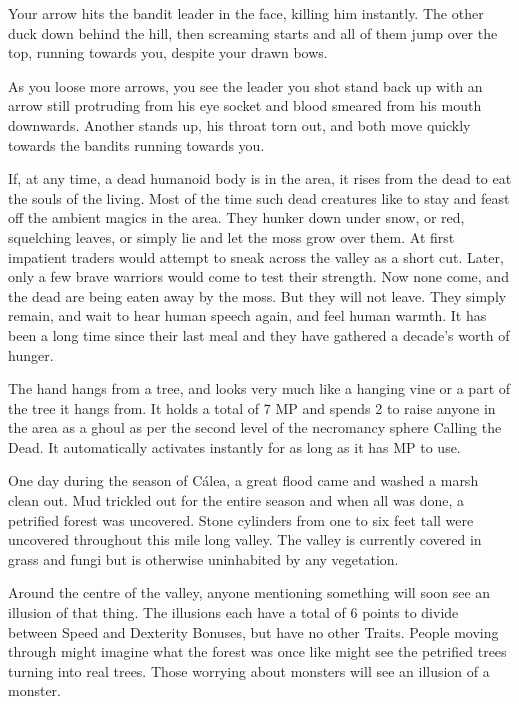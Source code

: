 \begin{multicols}{2}
\begin{boxtext}

  Your arrow hits the bandit leader in the face, killing him instantly.
  The other duck down behind the hill, then screaming starts and all of them jump over the top, running towards you, despite your drawn bows.

  As you loose more arrows, you see the leader you shot stand back up with an arrow still protruding from his eye socket and blood smeared from his mouth downwards.
  Another stands up, his throat torn out, and both move quickly towards the bandits running towards you.

\end{boxtext}

If, at any time, a dead humanoid body is in the area, it rises from the dead to eat the souls of the living.  Most of the time such dead creatures like to stay and feast off the ambient magics in the area.  They hunker down under snow, or red, squelching leaves, or simply lie and let the moss grow over them.   At first impatient traders would attempt to sneak across the valley as a short cut.  Later, only a few brave warriors would come to test their strength.  Now none come, and the dead are being eaten away by the moss.  But they will not leave.  They simply remain, and wait to hear human speech again, and feel human warmth.  It has been a long time since their last meal and they have gathered a decade's worth of hunger.

The hand hangs from a tree, and looks very much like a hanging vine or a part of the tree it hangs from.
It holds a total of 7 MP and spends 2 to raise anyone in the area as a ghoul as per the second level of the necromancy sphere Calling the Dead.
It automatically activates instantly for as long as it has MP to use.


One day during the season of C\'{a}lea, a great flood came and washed a marsh clean out.  Mud trickled out for the entire season and when all was done, a petrified forest was uncovered.  Stone cylinders from one to six feet tall were uncovered throughout this mile long valley.  The valley is currently covered in grass and fungi but is otherwise uninhabited by any vegetation.

Around the centre of the valley, anyone mentioning something will soon see an illusion of that thing.  The illusions each have a total of 6 points to divide between Speed and Dexterity Bonuses, but have no other Traits.  People moving through might imagine what the forest was once like might see the petrified trees turning into real trees.  Those worrying about monsters will see an illusion of a monster.


\end{multicols}
